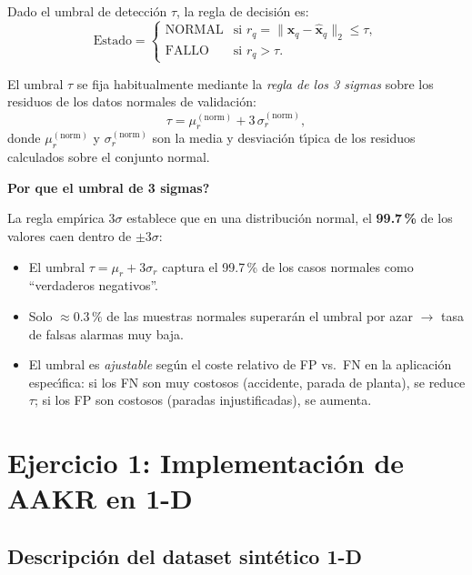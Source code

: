 \documentclass[12pt,a4paper]{article}
\newcommand{\porque}[2]{%
  \vspace{8pt}%
  \begin{mdframed}[backgroundcolor=porqueFondo,
                   linecolor=porqueBorde,
                   linewidth=1.5pt,
                   leftmargin=0pt,
                   rightmargin=0pt,
                   innerleftmargin=10pt,
                   innerrightmargin=10pt,
                   innertopmargin=6pt,
                   innerbottommargin=6pt]
    {\color{porqueBorde}\bfseries\small Por que #1}\\[3pt]
    {\small #2}
  \end{mdframed}%
  \vspace{8pt}%
}
\begin{document}
Dado el umbral de detecci\'on $\tau$, la regla de decisi\'on es:
\begin{equation}\label{eq:decision}
  \text{Estado} =
  \begin{cases}
    \text{NORMAL} & \text{si } r_q = \|\mathbf{x}_q - \hat{\mathbf{x}}_q\|_2 \leq \tau, \\[4pt]
    \text{FALLO}  & \text{si } r_q > \tau.
  \end{cases}
\end{equation}

El umbral $\tau$ se fija habitualmente mediante la \emph{regla de los 3 sigmas}
sobre los residuos de los datos normales de validaci\'on:
\begin{equation}\label{eq:threshold}
  \tau = \mu_r^{(\text{norm})} + 3\,\sigma_r^{(\text{norm})},
\end{equation}
donde $\mu_r^{(\text{norm})}$ y $\sigma_r^{(\text{norm})}$ son la media y
desviaci\'on t\'{\i}pica de los residuos calculados sobre el conjunto normal.

\porque{el umbral de 3 sigmas?}{%
La regla emp\'{\i}rica $3\sigma$ establece que en una distribuci\'on normal, el
\textbf{99.7\,\%} de los valores caen dentro de $\pm 3\sigma$:
\begin{itemize}[leftmargin=1.5em,noitemsep]
  \item El umbral $\tau = \mu_r + 3\sigma_r$ captura el 99.7\,\% de los casos
        normales como ``verdaderos negativos''.
  \item Solo $\approx 0.3\,\%$ de las muestras normales superar\'an el umbral
        por azar $\to$ tasa de falsas alarmas muy baja.
  \item El umbral es \emph{ajustable} seg\'un el coste relativo de FP vs.\ FN en
        la aplicaci\'on espec\'{\i}fica: si los FN son muy costosos (accidente, parada
        de planta), se reduce $\tau$; si los FP son costosos (paradas injustificadas),
        se aumenta.
\end{itemize}}

\section{Ejercicio 1: Implementaci\'on de AAKR en 1-D}

\subsection{Descripci\'on del dataset sint\'etico 1-D}
\end{document}
